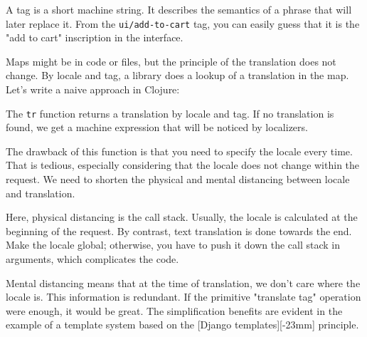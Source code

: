 A tag is a short machine string.
It describes the semantics of a phrase that will later replace it.
From the \verb|ui/add-to-cart| tag, you can easily guess that it is the "add to cart" inscription in the interface.

Maps might be in code or files, but the principle of the translation does not change. By locale and tag, a library does a lookup of a translation in the map.
Let's write a naive approach in Clojure:


\ifx\DEVICETYPE\MOBILE



\else



\fi


The \verb|tr| function returns a translation by locale and tag. If no translation is found, we get a machine expression that will be noticed by localizers.

The drawback of this function is that you need to specify the locale every time.
That is tedious, especially considering that the locale does not change within the request.
We need to shorten the physical and mental distancing between locale and translation.


Here, physical distancing is the call stack.
Usually, the locale is calculated at the beginning of the request. By contrast, text translation is done towards the end.
Make the locale global; otherwise, you have to push it down the call stack in arguments, which complicates the code.


Mental distancing means that at the time of translation, we don't care where the locale is.
This information is redundant.
If the primitive "translate tag" operation were enough, it would be great. The simplification benefits are evident in the example of a template system based on the [Django templates][-23mm] principle.

